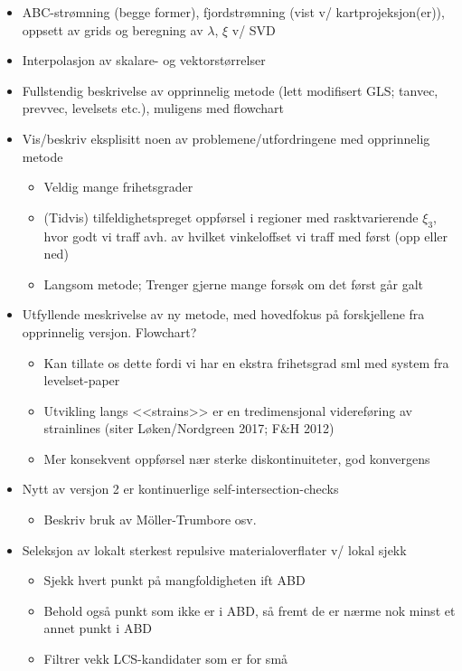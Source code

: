 \cleartorecto
\begin{framed}
    \begin{itemize}
        \item ABC-strømning (begge former), fjordstrømning (vist v/ kartprojeksjon(er)),
            oppsett av grids og beregning av $\lambda$, $\xi$ v/ SVD
        \item Interpolasjon av skalare- og vektorstørrelser
        \item Fullstendig beskrivelse av opprinnelig metode (lett modifisert GLS; tanvec, prevvec, levelsets etc.),
            muligens med flowchart
        \item Vis/beskriv eksplisitt noen av problemene/utfordringene med opprinnelig metode
            \begin{itemize}
                \item Veldig mange frihetsgrader
                \item (Tidvis) tilfeldighetspreget oppførsel i regioner med rasktvarierende $\xi_{3}$,
                    hvor godt vi traff avh. av hvilket vinkeloffset vi traff med først (opp eller ned)
                \item Langsom metode; Trenger gjerne mange forsøk om det først går galt
            \end{itemize}
        \item Utfyllende meskrivelse av ny metode, med hovedfokus på forskjellene fra opprinnelig versjon.
            Flowchart?
            \begin{itemize}
                \item Kan tillate os dette fordi vi har en ekstra frihetsgrad sml med system fra levelset-paper
                \item Utvikling langs <<strains>> er en tredimensjonal videreføring av strainlines (siter Løken/Nordgreen 2017; F\&H 2012)
                \item Mer konsekvent oppførsel nær sterke diskontinuiteter, god konvergens
            \end{itemize}
        \item Nytt av versjon 2 er kontinuerlige self-intersection-checks
            \begin{itemize}
                \item Beskriv bruk av Möller-Trumbore osv.
            \end{itemize}
        \item Seleksjon av lokalt sterkest repulsive materialoverflater v/ lokal sjekk
            \begin{itemize}
                \item Sjekk hvert punkt på mangfoldigheten ift ABD
                \item Behold også punkt som ikke er i ABD, så fremt de er nærme nok minst et annet punkt i ABD
                \item Filtrer vekk LCS-kandidater som er for små
            \end{itemize}
    \end{itemize}
\end{framed}

